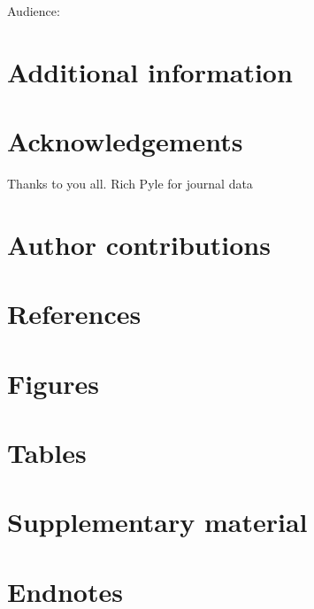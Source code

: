 \documentclass[
]{article}
\begin{document}
Audience:

\hypertarget{additional-information}{%
\section{Additional information}\label{additional-information}}

\hypertarget{acknowledgements}{%
\section{Acknowledgements}\label{acknowledgements}}

Thanks to you all. Rich Pyle for journal data

\hypertarget{author-contributions}{%
\section{Author contributions}\label{author-contributions}}

\hypertarget{references}{%
\section{References}\label{references}}

\hypertarget{figures}{%
\section{Figures}\label{figures}}

\hypertarget{tables}{%
\section{Tables}\label{tables}}

\hypertarget{supplementary-material}{%
\section{Supplementary material}\label{supplementary-material}}

\hypertarget{endnotes}{%
\section*{Endnotes}\label{endnotes}}
\end{document}

